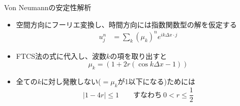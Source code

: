 \begin{frame}[t]{Von Neumannの安定性解析}
  \begin{itemize}
  \item 空間方向にフーリエ変換し、時間方向には指数関数型の解を仮定する
    \begin{align*}
    u_j^n &= \sum_k (\mu_k)^n e^{ik\Delta x \cdot j}
    \end{align*}
  \item FTCS法の式に代入し、波数$k$の項を取り出すと
    \[
    \mu_k =  (1 + 2r(\cos k \Delta x - 1))
    \]
  \item 全ての$k$に対し発散しない(\(=\mu_k\)が1以下になる)ためには
    \[
      | 1 - 4r | \le 1 \qquad \text{すなわち} \ 0 < r \le \frac{1}{2}
    \]
  \end{itemize}
\end{frame}

